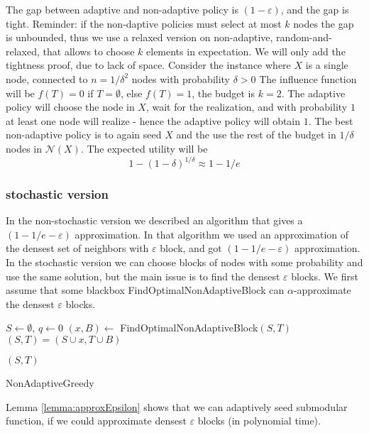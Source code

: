 The gap between adaptive and non-adaptive policy is $(1-\varepsilon)$, and the gap is tight. Reminder: if the non-daptive policies must select at most $k$ nodes the gap is unbounded, thus we use a relaxed version on non-adaptive, random-and-relaxed, that allows to choose $k$ elements in expectation. We will only add the tightness proof, due to lack of space.
Consider the instance where $X$ is a single node, connected to $n=1/\delta^2$ nodes with probability $\delta>0$
The influence function will be $f(T)=0$ if $T=\emptyset$, else $f(T)=1$, the budget is $k=2$.
The adaptive policy will choose the node in $X$, wait for the realization, and with probability $1$ at least one node will realize - hence the adaptive policy will obtain $1$. The best non-adaptive policy is to again seed $X$ and the use the rest of the budget in $1/\delta$ nodes in $\mathcal{N}(X)$. The expected utility will be $$1-(1-\delta)^{1/\delta}\approx 1-1/e$$

\subsubsection{stochastic version}
In the non-stochastic version we described an algorithm that gives a $(1-1/e-\varepsilon)$ approximation. In that algorithm we used an approximation of the densest set of neighbors with $\varepsilon$ block, and got  $(1-1/e-\varepsilon)$ approximation. In the stochastic version we can choose blocks of nodes with some probability and use the same solution, but the main issue is to find the densest $\varepsilon$ blocks.
We first assume that some blackbox FindOptimalNonAdaptiveBlock can $\alpha$-approximate the densest $\varepsilon$ blocks.


\IncMargin{2em}
\begin{algorithm}[h]
	\LinesNumbered
	$S\gets\emptyset$, $q\gets 0$ 
	{
		$(x,B)\gets$ FindOptimalNonAdaptiveBlock$(S,T)$
		$(S,T) = (S\cup x,T\cup B)$
	}

	\Return $(S,T)$
	\caption{NonAdaptiveGreedy}\label{algo:nonAda}
\end{algorithm}\DecMargin{1em}


Lemma \ref{lemma:approxEpsilon} shows that we can adaptively seed submodular function,  if we could approximate densest $\varepsilon$ blocks (in polynomial time). 
